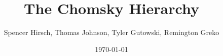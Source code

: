 \documentclass{article}
\begin{document}
\title{The Chomsky Hierarchy}
\author{Spencer Hirsch, Thomas Johnson, Tyler Gutowski, Remington Greko}
\date{\today}
\end{document}
